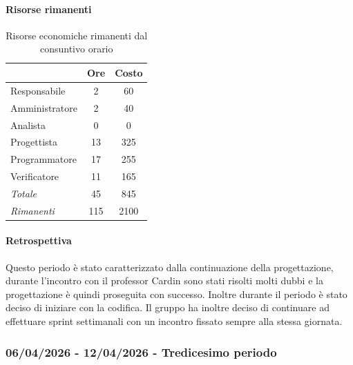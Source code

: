 \documentclass[a4paper,12pt]{article}
\begin{document}
            \paragraph{Risorse rimanenti}
                \begin{table}[H]
                \centering
                \caption{Risorse economiche rimanenti dal consuntivo orario}
                \begin{tabular}{|l|c|c|}
                \hline
                    \rowcolor{lightgray}{\textbf{Ruolo}} & {\textbf{Ore}} & {\textbf{Costo}}\\
                \hline
                    Responsabile & 2 & 60\\
                \hline
                    Amministratore & 2 & 40\\
                \hline
                    Analista & 0 & 0\\
                \hline
                    Progettista & 13 & 325\\
                \hline
                    Programmatore & 17 & 255\\
                \hline
                    Verificatore & 11 & 165\\
                \hline
                    \rowcolor{lightgray}\textit{Totale} & 45 & 845\\
                \hline
                    \rowcolor{lightgray}\textit{Rimanenti} & 115 & 2100\\
                \hline
                \end{tabular}
                \end{table}
                
            \paragraph{Retrospettiva}
            Questo periodo è stato caratterizzato dalla continuazione della progettazione, durante l'incontro con il professor Cardin sono stati risolti molti dubbi e la progettazione è quindi proseguita con successo.
            Inoltre durante il periodo è stato deciso di iniziare con la codifica. Il gruppo ha inoltre deciso di continuare ad effettuare sprint settimanali con un incontro fissato sempre alla stessa giornata.

        \subsubsection{06/04/2026 - 12/04/2026 - Tredicesimo periodo}
\end{document}
